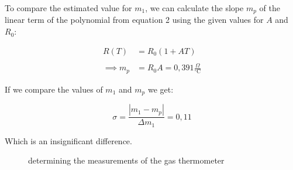 \documentclass{article}
\begin{document}
To compare the estimated value for $m_1$, we can calculate the slope $m_p$ of the linear term of the polynomial from equation 2 using the given values for $A$ and $R_0$:

\begin{equation}
    \begin{split}
        R(T) &= R_0 (1+AT) \\ \\ 
        \implies m_p &= R_0 A = 0,391 \frac{\Omega}{^{\circ}\text{C}}
    \end{split}
\end{equation}

If we compare the values of $m_1$ and $m_p$ we get:

\begin{equation}
    \sigma = \frac{\left| m_1 - m_p \right|}{\Delta m_1} = 0,11
\end{equation}

Which is an insignificant difference.

\begin{figure} [!p]
    \centering
    \caption{determining the measurements of the gas thermometer}
\end{figure}
\end{document}
